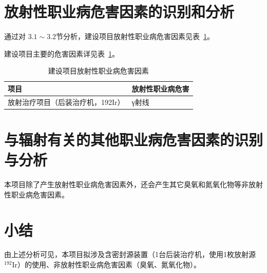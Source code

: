\section{放射性职业病危害因素的识别和分析}

通过对 $3 . 1 { \sim } 3 . 2$节分析，建设项目放射性职业病危害因素见表~\ref{tab:ch3-hazards}。

建设项目主要的危害因素详见表~\ref{tab:ch3-hazards}。


\begin{table}[H]
\centering
\caption{建设项目放射性职业病危害因素}
\label{tab:ch3-hazards}
\begin{tabularx}{\linewidth}{|>{\centering\arraybackslash}X|>{\centering\arraybackslash}X|}
\hline
项目 & 放射性职业病危害 \\
\hline
放射治疗项目（后装治疗机，192Ir） & γ射线 \\
\hline
\end{tabularx}
\end{table}


\section{与辐射有关的其他职业病危害因素的识别与分析}

本项目除了产生放射性职业病危害因素外，还会产生其它臭氧和氮氧化物等非放射性职业病危害因素。

\section{小结}

由上述分析可见，本项目拟涉及含密封源装置（1台后装治疗机，使用1枚放射源 $^ { 1 9 2 } \mathrm { I r }$）的使用、非放射性职业病危害因素（臭氧、氮氧化物）。
